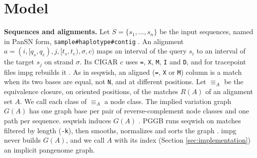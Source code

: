 
\ifdefined\proposition\else\newtheorem{proposition}{Proposition}\fi

\section{Model}
\label{sec:model}

\textbf{Sequences and alignments.}
Let $S=\{s_1,\dots,s_n\}$ be the input sequences, named in PanSN form, \texttt{sample\#haplotype\#contig} \citep{Garrison2022pansn}.
An alignment $a=(i,[q_s,q_e),j,[t_s,t_e),\sigma,c)$ maps an interval of the query $s_i$ to an interval of the target $s_j$ on strand $\sigma$.
Its CIGAR $c$ uses \texttt{=}, \texttt{X}, \texttt{M}, \texttt{I} and \texttt{D}, and for tracepoint files impg rebuilds it \citep{Kaushan2026tracepoints}.
As in seqwish, an aligned (\texttt{=}, \texttt{X} or \texttt{M}) column is a match when its two bases are equal, not \texttt{N}, and at different positions.
Let $\equiv_A$ be the equivalence closure, on oriented positions, of the matches $R(A)$ of an alignment set $A$.
We call each class of $\equiv_A$ a node class.
The implied variation graph $G(A)$ has one graph base per pair of reverse-complement node classes and one path per sequence.
seqwish induces $G(A)$ \citep{Garrison2023seqwish}.
PGGB runs seqwish on matches filtered by length (\texttt{-k}), then smooths, normalizes and sorts the graph \citep{Garrison2024pggb}.
impg never builds $G(A)$, and we call $A$ with its index (Section \ref{sec:implementation}) an implicit pangenome graph.

